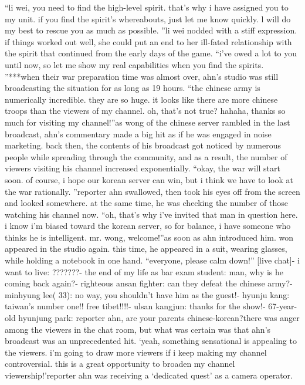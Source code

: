 “li wei, you need to find the high-level spirit.
 that’s why i have assigned you to my unit.
 if you find the spirit’s whereabouts, just let me know quickly.
 l will do my best to rescue you as much as possible.
”li wei nodded with a stiff expression.
 if things worked out well, she could put an end to her ill-fated relationship with the spirit that continued from the early days of the game.
“i’ve owed a lot to you until now, so let me show my real capabilities when you find the spirits.
”***when their war preparation time was almost over, ahn’s studio was still broadcasting the situation for as long as 19 hours.
“the chinese army is numerically incredible.
 they are so huge.
 it looks like there are more chinese troops than the viewers of my channel.
 oh, that’s not true? hahaha, thanks so much for visiting my channel!”as wong of the chinese server rambled in the last broadcast, ahn’s commentary made a big hit as if he was engaged in noise marketing.
back then, the contents of his broadcast got noticed by numerous people while spreading through the community, and as a result, the number of viewers visiting his channel increased exponentially.
“okay, the war will start soon.
 of course, i hope our korean server can win, but i think we have to look at the war rationally.
”reporter ahn swallowed, then took his eyes off from the screen and looked somewhere.
at the same time, he was checking the number of those watching his channel now.
“oh, that’s why i’ve invited that man in question here.
 i know i’m biased toward the korean server, so for balance, i have someone who thinks he is intelligent.
 mr.
 wong, welcome!”as soon as ahn introduced him.
 won appeared in the studio again.
this time, he appeared in a suit, wearing glasses, while holding a notebook in one hand.
“everyone, please calm down!”
[live chat]- i want to live: ???????- the end of my life as bar exam student: man, why is he coming back again?- righteous ansan fighter: can they defeat the chinese army?- minhyung lee( 33): no way, you shouldn’t have him as the guest!- hyunju kang: taiwan’s number one!! free tibet!!!!- ulsan kangjun: thanks for the show!- 67-year-old hyunjung park: reporter ahn, are your parents chinese-korean?there was anger among the viewers in the chat room, but what was certain was that ahn’s broadcast was an unprecedented hit.
‘yeah, something sensational is appealing to the viewers.
 i’m going to draw more viewers if i keep making my channel controversial.
 this is a great opportunity to broaden my channel viewership!’reporter ahn was receiving a ‘dedicated quest’ as a camera operator.
